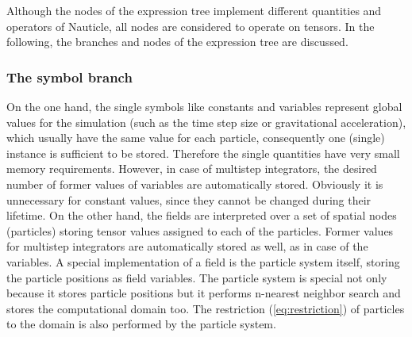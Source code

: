 \documentclass[a4paper,12pt,openany]{book}
\newcommand{\equref}[1]{(\ref{#1})}
\theoremstyle{break}
\begin{document}
Although the nodes of the expression tree implement different quantities and operators of Nauticle, all nodes are considered to operate on tensors. In the following, the branches and nodes of the expression tree are discussed.

\subsubsection{The symbol branch}
On the one hand, the single symbols like constants and variables represent global values for the simulation (such as the time step size or gravitational acceleration), which usually have the same value for each particle, consequently one (single) instance is sufficient to be stored. Therefore the single quantities have very small memory requirements. However, in case of multistep integrators, the desired number of former values of variables are automatically stored. Obviously it is unnecessary for constant values, since they cannot be changed during their lifetime. On the other hand, the fields are interpreted over a set of spatial nodes (particles) storing tensor values assigned to each of the particles. Former values for multistep integrators are automatically stored as well, as in case of the variables. A special implementation of a field is the particle system itself, storing the particle positions as field variables. The particle system is special not only because it stores particle positions but it performs n-nearest neighbor search and stores the computational domain too. The restriction \equref{eq:restriction} of particles to the domain is also performed by the particle system.
\end{document}
